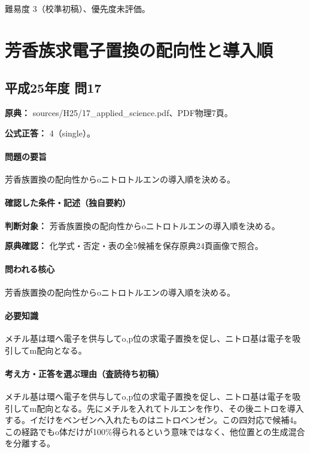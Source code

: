 \par 難易度 3（校準初稿）、優先度未評価。

\section{芳香族求電子置換の配向性と導入順}

\subsection{平成25年度 問17}
\label{q:h25-reg-applied-17}

\noindent\textbf{原典：} sources/H25/17\_applied\_science.pdf、PDF物理7頁。

\textbf{公式正答：} 4（single）。

\paragraph{問題の要旨} 芳香族置換の配向性からoニトロトルエンの導入順を決める。

\paragraph{確認した条件・記述（独自要約）}\mbox{}\par

\noindent\textbf{判断対象：} 芳香族置換の配向性からoニトロトルエンの導入順を決める。\par

\noindent\textbf{原典確認：} 化学式・否定・表の全5候補を保存原典24頁画像で照合。\par

\paragraph{問われる核心} 芳香族置換の配向性からoニトロトルエンの導入順を決める。

\paragraph{必要知識} メチル基は環へ電子を供与してo,p位の求電子置換を促し、ニトロ基は電子を吸引してm配向となる。

\paragraph{考え方・正答を選ぶ理由（査読待ち初稿）} メチル基は環へ電子を供与してo,p位の求電子置換を促し、ニトロ基は電子を吸引してm配向となる。先にメチルを入れてトルエンを作り、その後ニトロを導入する。イだけをベンゼンへ入れたものはニトロベンゼン。この四対応で候補4。この経路でもo体だけが100\%得られるという意味ではなく、他位置との生成混合を分離する。

